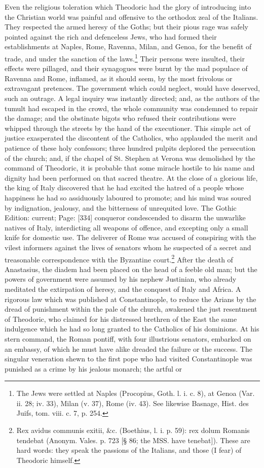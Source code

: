Even the religious toleration which Theodoric had the glory of introducing into the Christian world was painful and offensive to the orthodox zeal of the Italians. They respected the armed heresy of the Goths; but their pious rage was safely pointed against the rich and defenceless Jews, who had formed their establishments at Naples, Rome, Ravenna, Milan, and Genoa, for the benefit of trade, and under the sanction of the laws.\footnote{The Jews were settled at Naples (Procopius, Goth. l. i. c. 8), at Genoa (Var. ii. 28; iv. 33), Milan (v. 37), Rome (iv. 43). See likewise Basnage, Hist. des Juifs, tom. viii. c. 7, p. 254.} Their persons were insulted, their effects were pillaged, and their synagogues were burnt by the mad populace of Ravenna and Rome, inflamed, as it should seem, by the most frivolous or extravagant pretences. The government which could neglect, would have deserved, such an outrage. A legal inquiry was instantly directed; and, as the authors of the tumult had escaped in the crowd, the whole community was condemned to repair the damage; and the obstinate bigots who refused their contributions were whipped through the streets by the hand of the executioner. This simple act of justice exasperated the discontent of the Catholics, who applauded the merit and patience of these holy confessors; three hundred pulpits deplored the persecution of the church; and, if the chapel of St. Stephen at Verona was demolished by the command of Theodoric, it is probable that some miracle hostile to his name and dignity had been performed on that sacred theatre. At the close of a glorious life, the king of Italy discovered that he had excited the hatred of a people whose happiness he had so assiduously laboured to promote; and his mind was soured by indignation, jealousy, and the bitterness of unrequited love. The Gothic Edition: current; Page: [334] conqueror condescended to disarm the unwarlike natives of Italy, interdicting all weapons of offence, and excepting only a small knife for domestic use. The deliverer of Rome was accused of conspiring with the vilest informers against the lives of senators whom he suspected of a secret and treasonable correspondence with the Byzantine court.\footnote{Rex avidus communis exitii, \&c. (Boethius, l. i. p. 59): rex dolum Romanis tendebat (Anonym. Vales. p. 723 [§ 86; the MSS. have tenebat]). These are hard words: they speak the passions of the Italians, and those (I fear) of Theodoric himself.} After the death of Anastasius, the diadem had been placed on the head of a feeble old man; but the powers of government were assumed by his nephew Justinian, who already meditated the extirpation of heresy, and the conquest of Italy and Africa. A rigorous law which was published at Constantinople, to reduce the Arians by the dread of punishment within the pale of the church, awakened the just resentment of Theodoric, who claimed for his distressed brethren of the East the same indulgence which he had so long granted to the Catholics of his dominions. At his stern command, the Roman pontiff, with four illustrious senators, embarked on an embassy, of which he must have alike dreaded the failure or the success. The singular veneration shewn to the first pope who had visited Constantinople was punished as a crime by his jealous monarch; the artful or 